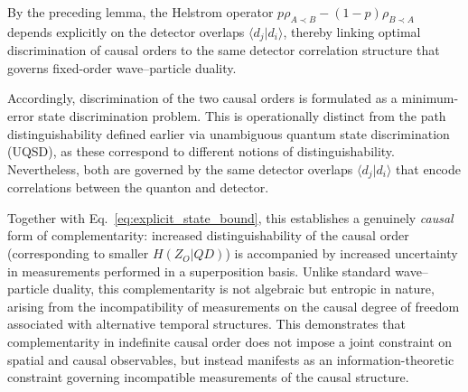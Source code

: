 \documentclass[aps,pra,reprint,superscriptaddress]{revtex4-2}
\begin{document}
By the preceding lemma, the Helstrom operator
$p\rho_{A\prec B}-(1-p)\rho_{B\prec A}$ depends explicitly on the detector overlaps $\langle d_j|d_i\rangle$, thereby linking optimal discrimination of causal orders to the same detector correlation structure that governs fixed-order wave--particle duality.

Accordingly, discrimination of the two causal orders is formulated as a minimum-error state discrimination problem. This is operationally distinct from the path distinguishability defined earlier via unambiguous quantum state discrimination (UQSD), as these correspond to different notions of distinguishability. Nevertheless, both are governed by the same detector overlaps $\langle d_j|d_i\rangle$ that encode correlations between the quanton and detector.

Together with Eq.~\eqref{eq:explicit_state_bound}, this establishes a genuinely \emph{causal} form of complementarity: increased distinguishability of the causal order (corresponding to smaller $H(Z_O|QD)$) is accompanied by increased uncertainty in measurements performed in a superposition basis. Unlike standard wave--particle duality, this complementarity is not algebraic but entropic in nature, arising from the incompatibility of measurements on the causal degree of freedom associated with alternative temporal structures. This demonstrates that complementarity in indefinite causal order does not impose a joint constraint on spatial and causal observables, but instead manifests as an information-theoretic constraint governing incompatible measurements of the causal structure.
 
	
\end{document}

